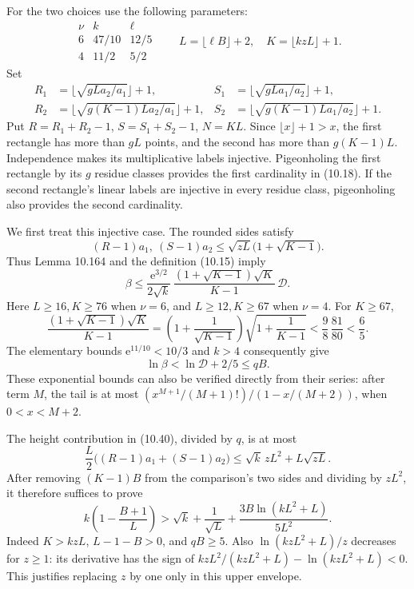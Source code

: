\documentclass[
  11pt,
  a4paper,
]{article}
\begin{document}
For the two choices use the following parameters: \[
\begin{array}{c|cc}
\nu&k&\ell\\ \hline
6&47/10&12/5\\
4&11/2&5/2
\end{array}
\qquad L=\lfloor\ell B\rfloor+2,\quad K=\lfloor kzL\rfloor+1.
\tag{10.558}
\] Set \[
\begin{aligned}
R_1&=\lfloor\sqrt{gLa_2/a_1}\rfloor+1,&
S_1&=\lfloor\sqrt{gLa_1/a_2}\rfloor+1,\\
R_2&=\lfloor\sqrt{g(K-1)La_2/a_1}\rfloor+1,&
S_2&=\lfloor\sqrt{g(K-1)La_1/a_2}\rfloor+1.
\end{aligned}
\tag{10.559}
\] Put \(R=R_1+R_2-1\), \(S=S_1+S_2-1\), \(N=KL\). Since
\(\lfloor x\rfloor+1>x\), the first rectangle has more than \(gL\)
points, and the second has more than \(g(K-1)L\). Independence makes its
multiplicative labels injective. Pigeonholing the first rectangle by its
\(g\) residue classes provides the first cardinality in (10.18). If the
second rectangle's linear labels are injective in every residue class,
pigeonholing also provides the second cardinality.

We first treat this injective case. The rounded sides satisfy \[
(R-1)a_1,\ (S-1)a_2
\le\sqrt{zL}\bigl(1+\sqrt{K-1}\bigr).
\tag{10.560}
\] Thus Lemma 10.164 and the definition (10.15) imply \[
\beta\le
\frac{\mathrm e^{3/2}}{2\sqrt{k}}\,
\frac{(1+\sqrt{K-1})\sqrt K}{K-1}\,\mathcal D.
\tag{10.561}
\] Here \(L\ge16,K\ge76\) when \(\nu=6\), and \(L\ge12,K\ge67\) when
\(\nu=4\). For \(K\ge67\), \[
\frac{(1+\sqrt{K-1})\sqrt K}{K-1}
=\left(1+\frac1{\sqrt{K-1}}\right)
\sqrt{1+\frac1{K-1}}
<\frac98\,\frac{81}{80}<\frac65.
\tag{10.562}
\] The elementary bounds \(\mathrm e^{11/10}<10/3\) and \(k>4\)
consequently give \[
\ln\beta<\ln\mathcal D+2/5\le qB.
\tag{10.563}
\] These exponential bounds can also be verified directly from their
series: after term \(M\), the tail is at most
\((x^{M+1}/(M+1)!)/(1-x/(M+2))\), when \(0<x<M+2\).

The height contribution in (10.40), divided by \(q\), is at most \[
\frac L2\bigl((R-1)a_1+(S-1)a_2\bigr)
\le \sqrt{k}\,zL^2+L\sqrt{zL}.
\tag{10.564}
\] After removing \((K-1)B\) from the comparison's two sides and
dividing by \(zL^2\), it therefore suffices to prove \[
k\left(1-\frac{B+1}{L}\right)
\mathrel{>}\sqrt{k}+\frac1{\sqrt L}
\mathbin{+}\frac{3B\ln(kL^2+L)}{5L^2}.
\tag{10.565}
\] Indeed \(K>kzL\), \(L-1-B>0\), and \(qB\ge5\). Also
\(\ln(kzL^2+L)/z\) decreases for \(z\ge1\): its derivative has the sign
of \(kzL^2/(kzL^2+L)-\ln(kzL^2+L)<0\). This justifies replacing \(z\) by
one only in this upper envelope.
\end{document}
